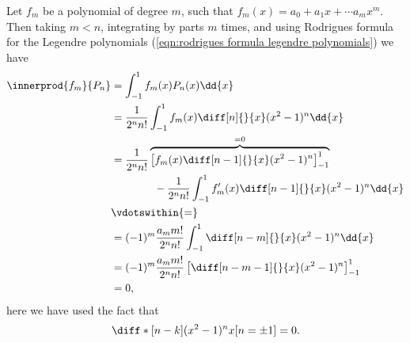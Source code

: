 \documentclass[fleqn]{NotesClass}
\begin{document}
    Let \(f_m\) be a polynomial of degree \(m\), such that \(f_m(x) = a_0 + a_1x + \dotsb a_mx^m\).
    Then taking \(m < n\), integrating by parts \(m\) times, and using Rodrigues formula for the Legendre polynomials (\cref{eqn:rodrigues formula legendre polynomials}) we have
    \begin{align}\label{eqn:inner prod polynomial and legendre polynomial}
        \innerprod{f_m}{P_n} &= \int_{-1}^{1} f_m(x) P_n(x)\dd{x}\\
        &= \frac{1}{2^nn!} \int_{-1}^{1} f_m(x) \diff[n]{}{x}(x^2 - 1)^n \dd{x}\\
        &= \frac{1}{2^nn!} \overbrace{\left[ f_m(x) \diff[n-1]{}{x}(x^2 - 1)^n \right]_{-1}^{1}}^{=0}\\
        &\qquad\qquad- \frac{1}{2^nn!} \int_{-1}^{1} f_m'(x) \diff[n - 1]{}{x} (x^2 - 1)^n \dd{x}\\
        &\vdotswithin{=}\notag\\
        &= (-1)^m \frac{a_mm!}{2^nn!} \int_{-1}^{1} \diff[n-m]{}{x}(x^2 - 1)^n \dd{x}\\
        &= (-1)^m \frac{a_mm!}{2^nn!} \left[ \diff[n-m-1]{}{x} (x^2 - 1)^n \right]_{-1}^{1}\\
        &= 0,
    \end{align}
    here we have used the fact that
    \begin{equation}
        \diff*[n - k]{(x^2 - 1)^n}{x}[n=\pm 1] = 0.
    \end{equation}
    
\end{document}
